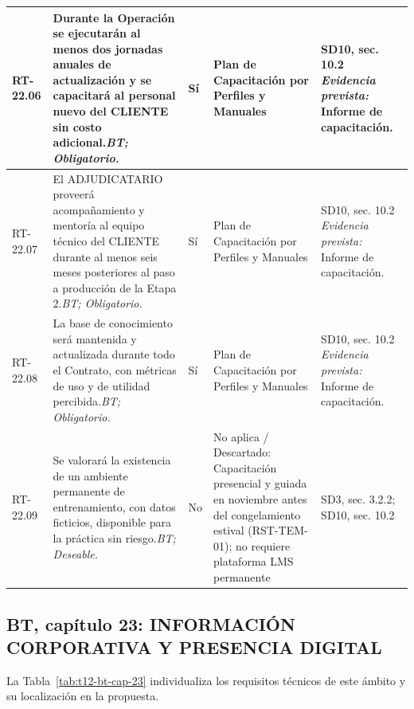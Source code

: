 \begin{paginaHorizontalSynaptix}
\begin{longtable}{|L{0.09\AnchoMatrizTDoce}|L{0.385\AnchoMatrizTDoce}|L{0.065\AnchoMatrizTDoce}|L{0.18\AnchoMatrizTDoce}|L{0.28\AnchoMatrizTDoce}|}
RT-\allowbreak{}22.\allowbreak{}06 &
Durante la Operación se ejecutarán al menos dos jornadas anuales de actualización y se capacitará al personal nuevo del CLIENTE sin costo adicional.\newline\textit{BT; Obligatorio.} &
Sí &
Plan de Capacitación por Perfiles y Manuales &
SD10, sec. 10.2 \newline\textit{Evidencia prevista:} Informe de capacitación. \\ \hline

RT-\allowbreak{}22.\allowbreak{}07 &
El ADJUDICATARIO proveerá acompañamiento y mentoría al equipo técnico del CLIENTE durante al menos seis meses posteriores al paso a producción de la Etapa 2.\newline\textit{BT; Obligatorio.} &
Sí &
Plan de Capacitación por Perfiles y Manuales &
SD10, sec. 10.2 \newline\textit{Evidencia prevista:} Informe de capacitación. \\ \hline

RT-\allowbreak{}22.\allowbreak{}08 &
La base de conocimiento será mantenida y actualizada durante todo el Contrato, con métricas de uso y de utilidad percibida.\newline\textit{BT; Obligatorio.} &
Sí &
Plan de Capacitación por Perfiles y Manuales &
SD10, sec. 10.2 \newline\textit{Evidencia prevista:} Informe de capacitación. \\ \hline

RT-\allowbreak{}22.\allowbreak{}09 &
Se valorará la existencia de un ambiente permanente de entrenamiento, con datos ficticios, disponible para la práctica sin riesgo.\newline\textit{BT; Deseable.} &
No &
No aplica / Descartado: Capacitación presencial y guiada en noviembre antes del congelamiento estival (RST-TEM-01); no requiere plataforma LMS permanente &
SD3, sec. 3.2.2; SD10, sec. 10.2 \\ \hline

\end{longtable}


\subsection*{BT, capítulo 23: INFORMACIÓN CORPORATIVA Y PRESENCIA DIGITAL}


La Tabla~\ref{tab:t12-bt-cap-23} individualiza los requisitos técnicos de este ámbito y su localización en la propuesta.


\end{paginaHorizontalSynaptix}
